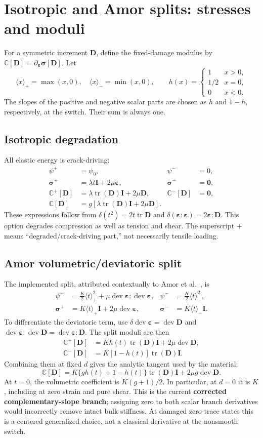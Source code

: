 \documentclass[11pt,a4paper]{article}
\newcommand{\eps}{\bm{\varepsilon}}
\newcommand{\sig}{\bm{\sigma}}
\newcommand{\I}{\bm{I}}
\newcommand{\D}{\bm{D}}
\newcommand{\C}{\mathbb{C}}
\newcommand{\tr}{\operatorname{tr}}
\newcommand{\dev}{\operatorname{dev}}
\newcommand{\pos}[1]{\langle #1\rangle_+}
\newcommand{\negp}[1]{\langle #1\rangle_-}
\newcommand{\sectionpage}[1]{\clearpage\section{#1}}
\numberwithin{equation}{section}
\begin{document}
\sectionpage{Isotropic and Amor splits: stresses and moduli}
\label{sec:amor}
For a symmetric increment $\D$, define the fixed-damage modulus by
$\C[\D]=\partial_{\eps}\sig[\D]$. Let
\begin{equation}
 \pos{x}=\max(x,0),\quad\negp{x}=\min(x,0),\qquad
 h(x)=\begin{cases}1&x>0,\\1/2&x=0,\\0&x<0.\end{cases}\label{eq:h}
\end{equation}
The slopes of the positive and negative scalar parts are chosen as $h$ and
$1-h$, respectively, at the switch. Their sum is always one.

\subsection{Isotropic degradation}
All elastic energy is crack-driving:
\begin{align}
 \psi^+&=\psi_0, & \psi^-&=0,\\
 \sig^+&=\lambda t\I+2\mu\eps, & \sig^-&=\bm0,\\
 \C^+[\D]&=\lambda\tr(\D)\I+2\mu\D,&\C^-[\D]&=\bm0,\\
 \C[\D]&=g\left[\lambda\tr(\D)\I+2\mu\D\right].
\end{align}
These expressions follow from $\delta(t^2)=2t\tr\D$ and
$\delta(\eps:\eps)=2\eps:\D$. This option degrades compression as well as
tension and shear. The superscript $+$ means ``degraded/crack-driving part,''
not necessarily tensile loading.

\subsection{Amor volumetric/deviatoric split}
The implemented split, attributed contextually to Amor et al.\ \cite{amor}, is
\begin{align}
 \psi^+&=\frac K2\pos{t}^2+\mu\dev\eps:\dev\eps,
 &\psi^-&=\frac K2\negp{t}^2,\\
 \sig^+&=K\pos{t}\I+2\mu\dev\eps,
 &\sig^-&=K\negp{t}\I.\label{eq:amor-stress}
\end{align}
To differentiate the deviatoric term, use
$\delta\dev\eps=\dev\D$ and
$\dev\eps:\dev\D=\dev\eps:\D$. The split moduli are then
\begin{align}
 \C^+[\D]&=K h(t)\tr(\D)\I+2\mu\dev\D,\\
 \C^-[\D]&=K[1-h(t)]\tr(\D)\I.
\end{align}
Combining them at fixed $d$ gives the analytic tangent used by the material:
\begin{equation}\boxed{
 \C[\D]=K\{g h(t)+1-h(t)\}\tr(\D)\I+2\mu g\dev\D.}
 \label{eq:amor-tangent}
\end{equation}
At $t=0$, the volumetric coefficient is $K(g+1)/2$. In particular, at $d=0$
it is $K$, including at zero strain and pure shear. This is the current
\textbf{corrected complementary-slope branch}; assigning zero to both scalar
branch derivatives would incorrectly remove intact bulk stiffness. At damaged
zero-trace states this is a centered generalized choice, not a classical
derivative at the nonsmooth switch.
\end{document}
